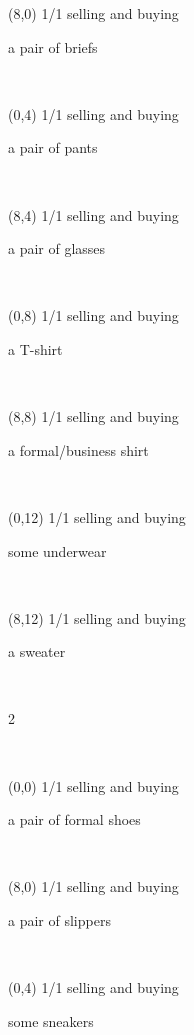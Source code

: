 \documentclass[a4paper]{article}
\newcommand{\mycard}[5]{%
	\vspace{0.1cm}
	\small #1 #2
	\par
	\parbox[t][6.7cm][c]{9.5cm}{%
	\hspace{0.1cm} \Large#3\\
	\normalsize#4 #5
	}
}
\begin{document}
\begin{textblock}{8}(8,0)
\mycard{1/1}{selling and buying}{\parbox{9.0cm}{
a pair of briefs
}}{}{} 
\end{textblock}

\begin{textblock}{8}(0,4)
\mycard{1/1}{selling and buying}{\parbox{9.0cm}{
a pair of pants
}}{}{} 
\end{textblock}

\begin{textblock}{8}(8,4)
\mycard{1/1}{selling and buying}{\parbox{9.0cm}{
a pair of glasses
}}{}{} 
\end{textblock}

\begin{textblock}{8}(0,8)
\mycard{1/1}{selling and buying}{\parbox{9.0cm}{
a T-shirt
}}{}{} 
\end{textblock}

\begin{textblock}{8}(8,8)
\mycard{1/1}{selling and buying}{\parbox{9.0cm}{
a formal/business shirt
}}{}{} 
\end{textblock}

\begin{textblock}{8}(0,12)
\mycard{1/1}{selling and buying}{\parbox{9.0cm}{
some underwear
}}{}{} 
\end{textblock}

\begin{textblock}{8}(8,12)
\mycard{1/1}{selling and buying}{\parbox{9.0cm}{
a sweater
}}{}{} 
\end{textblock}

\begin{tiny}2\end{tiny}\\
\newpage

\begin{textblock}{8}(0,0)
\mycard{1/1}{selling and buying}{\parbox{9.0cm}{
a pair of formal shoes
}}{}{} 
\end{textblock}

\begin{textblock}{8}(8,0)
\mycard{1/1}{selling and buying}{\parbox{9.0cm}{
a pair of slippers
}}{}{} 
\end{textblock}

\begin{textblock}{8}(0,4)
\mycard{1/1}{selling and buying}{\parbox{9.0cm}{
some sneakers
}}{}{} 
\end{textblock}
\end{document}
